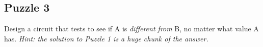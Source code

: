 \subsection*{Puzzle 3}

Design a circuit that tests to see if A is \emph{different from} B, no matter what value A has. \emph{Hint: the solution to Puzzle 1 is a huge chunk of the answer.}


